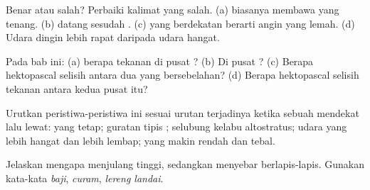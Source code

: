 \begin{exercise}[$\star$]\label{exo:g8:fronts-and-weather-maps:3}
Benar atau salah? Perbaiki kalimat yang salah. (a)  biasanya
membawa  yang tenang. (b)   datang sesudah .
(c)  yang berdekatan berarti angin yang lemah. (d) Udara dingin
lebih rapat daripada udara hangat.
\end{exercise}

\begin{exercise}[$\star$]\label{exo:g8:fronts-and-weather-maps:4}
Pada   bab ini: (a) berapa tekanan di pusat ? (b) Di pusat
? (c) Berapa hektopascal selisih antara dua  yang
bersebelahan? (d) Berapa hektopascal selisih tekanan antara kedua pusat
itu?
\end{exercise}

\begin{exercise}[$\star\star$]\label{exo:g8:fronts-and-weather-maps:5}
Urutkan peristiwa-peristiwa ini sesuai urutan terjadinya ketika sebuah
 mendekat lalu lewat:  yang tetap; guratan tipis 
; selubung kelabu altostratus; udara yang lebih hangat dan lebih
lembap;  yang makin rendah dan tebal.
\end{exercise}

\begin{exercise}[$\star\star$]\label{exo:g8:fronts-and-weather-maps:6}
Jelaskan mengapa   menjulang tinggi, sedangkan   menyebar berlapis-lapis. Gunakan kata-kata \emph{baji},
\emph{curam}, \emph{lereng landai}.
\end{exercise}


